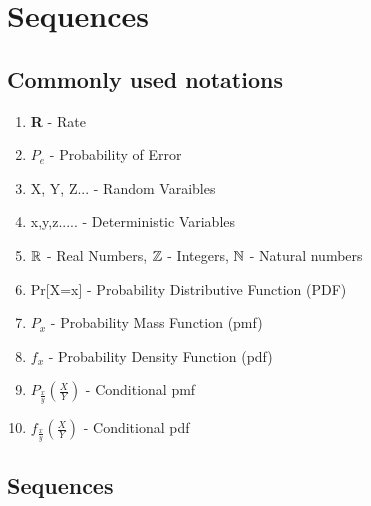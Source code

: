 \documentclass[a4paper]{article}
\begin{document}
\section{Sequences}
\subsection{Commonly used notations}
\begin{enumerate}
\item \textbf{R} - Rate
\item $P_e$ - Probability of Error
\item X, Y, Z...  - Random Varaibles
\item x,y,z..... - Deterministic Variables
\item $\mathbb R$ - Real Numbers, $\mathbb Z$ - Integers, $\mathbb N$ - Natural numbers
\item Pr[X=x] - Probability Distributive Function (PDF)
\item $P_x$ - Probability Mass Function (pmf)
\item $f_x$ - Probability Density Function (pdf)
\item $P_{\frac{x}{y}}(\frac{X}{Y})$ - Conditional pmf
\item $f_{\frac{x}{y}}(\frac{X}{Y})$ - Conditional pdf
\end{enumerate}
\subsection{Sequences}
\end{document}
